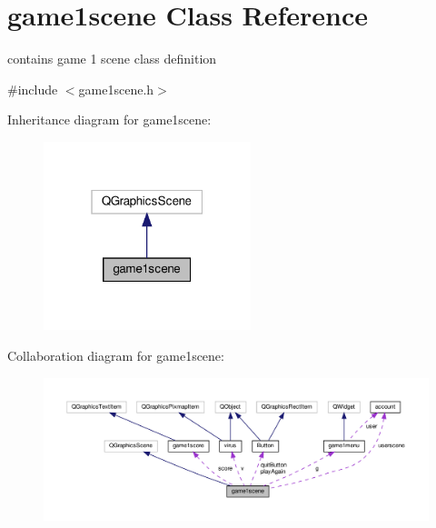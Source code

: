 \hypertarget{classgame1scene}{}\section{game1scene Class Reference}
\label{classgame1scene}


contains game 1 scene class definition  




{\ttfamily \#include $<$game1scene.\+h$>$}



Inheritance diagram for game1scene\+:\nopagebreak
\begin{figure}[H]
\begin{center}
\leavevmode
\includegraphics[width=171pt]{classgame1scene__inherit__graph}
\end{center}
\end{figure}


Collaboration diagram for game1scene\+:
\nopagebreak
\begin{figure}[H]
\begin{center}
\leavevmode
\includegraphics[width=350pt]{classgame1scene__coll__graph}
\end{center}
\end{figure}
